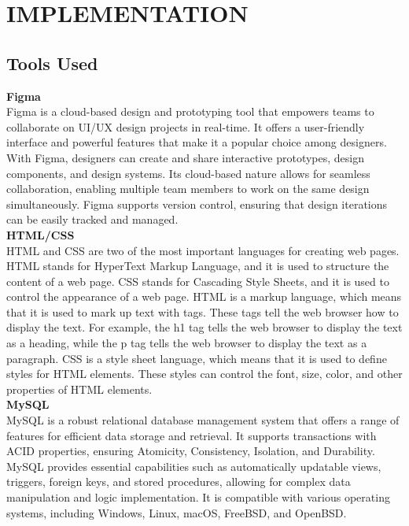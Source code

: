 \chapter{IMPLEMENTATION}





\section{Tools Used}
\textbf{Figma}\\
Figma is a cloud-based design and prototyping tool that empowers teams to collaborate on UI/UX design projects in real-time. It offers a user-friendly interface and powerful features that make it a popular choice among designers. With Figma, designers can create and share interactive prototypes, design components, and design systems. Its cloud-based nature allows for seamless collaboration, enabling multiple team members to work on the same design simultaneously. Figma supports version control, ensuring that design iterations can be easily tracked and managed. \\
\textbf{HTML/CSS}\\
HTML and CSS are two of the most important languages for creating web pages. HTML stands for HyperText Markup Language, and it is used to structure the content of a web page. CSS stands for Cascading Style Sheets, and it is used to control the appearance of a web page.
HTML is a markup language, which means that it is used to mark up text with tags. These tags tell the web browser how to display the text. For example, the h1 tag tells the web browser to display the text as a heading, while the p tag tells the web browser to display the text as a paragraph.
CSS is a style sheet language, which means that it is used to define styles for HTML elements. These styles can control the font, size, color, and other properties of HTML elements.\\
\textbf{MySQL}\\
MySQL is a robust relational database management system that offers a range of features for efficient data storage and retrieval. It supports transactions with ACID properties, ensuring Atomicity, Consistency, Isolation, and Durability. MySQL provides essential capabilities such as automatically updatable views, triggers, foreign keys, and stored procedures, allowing for complex data manipulation and logic implementation. It is compatible with various operating systems, including Windows, Linux, macOS, FreeBSD, and OpenBSD. \\
